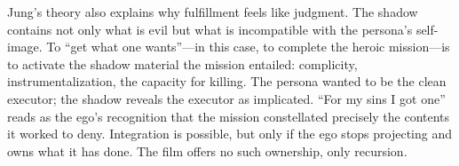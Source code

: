 Jung's theory also explains why fulfillment feels like judgment. The shadow contains not only 
what is evil but what is incompatible with the persona's self-image. To ``get what one 
wants''---in this case, to complete the heroic mission---is to activate the shadow material 
the mission entailed: complicity, instrumentalization, the capacity for killing. The persona 
wanted to be the clean executor; the shadow reveals the executor as implicated. ``For my sins 
I got one'' reads as the ego's recognition that the mission constellated precisely the 
contents it worked to deny. Integration is possible, but only if the ego stops projecting and 
owns what it has done. The film offers no such ownership, only recursion.

